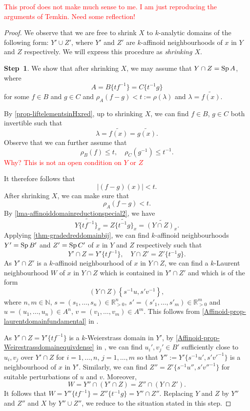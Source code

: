 \textcolor{red}{This proof does not make much sense to me. I am just reproducing the arguments of Temkin. Need some reflection!}


\begin{proof}
    We observe that we are free to shrink $X$ to $k$-analytic domains of the following form: $Y'\cup Z'$, where $Y'$ and $Z'$ are $k$-affinoid neighbourhoods of $x$ in $Y$ and $Z$ respectively. We will express this procedure as \emph{shrinking $X$}.

    \textbf{Step~1}. We show that after shrinking $X$, we may assume that $Y\cap Z=\operatorname{Sp} A$, where
    \[
        A=B\{tf^{-1}\}=C\{t^{-1}g\}  
    \]
    for some $f\in B$ and $g\in C$ and $\rho_A(f-g)<t:=\rho(\lambda)$ and $\lambda=\widetilde{f(x)}$.



    By \cref{prop-liftelementsinHxred}, up to shrinking $X$, we can find $f\in B$, $g\in C$ both invertible such that 
    \[
        \lambda=\widetilde{f(x)}=\widetilde{g(x)}.
    \]
    Observe that we can further assume that 
    \[
        \rho_B(f)\leq t,\quad \rho_C(g^{-1})\leq t^{-1}.
    \]
     \textcolor{red}{Why? This is not an open condition on $Y$ or $Z$}   

    It therefore follows that 
    \[
        |(f-g)(x)|<t.  
    \] 
    After shrinking $X$, we can make sure that 
    \[
        \rho_A(f-g)<t.
    \]
    By \cref{lma-affinoiddomainreductionspecial2}, we have
    \[
        \widetilde{Y\{tf^{-1}\}_x}= \widetilde{Z\{t^{-1}g\}_x}= \widetilde{(Y\cap Z)_x}.
    \]
    Applying \cref{thm-gradedreddomainbij}, we can find $k$-affinoid neighbourhoods $Y'=\operatorname{Sp} B'$ and $Z'=\operatorname{Sp} C'$ of $x$ in $Y$ and $Z$ respectively such that
    \[
        Y'\cap Z=Y'\{tf^{-1}\},\quad Y\cap Z'=Z'\{t^{-1}g\}. 
    \]
    As $Y'\cap Z'$ is a $k$-affinoid neighbourhood of $x$ in $Y\cap Z$, we can find a $k$-Laurent neighbourhood $W$ of $x$ in $Y\cap Z$ which is contained in $Y'\cap Z'$ and which is of the form
    \[
        (Y\cap Z)\left\{s^{-1}u,s'v^{-1}\right\},  
    \]
    where $n,m\in \mathbb{N}$, $s=(s_1,\ldots,s_n)\in \mathbb{R}_{>0}^n$, $s'=(s'_1,\ldots,s'_m)\in \mathbb{R}_{>0}^m$ and $u=(u_1,\ldots,u_n)\in A^n$, $v=(v_1,\ldots,v_m)\in A^m$. This follows from \cref{Affinoid-prop-laurentdomainfundamental} in .


    As $Y'\cap Z=Y'\{tf^{-1}\}$ is a $k$-Weierstrass domain in $Y'$, by \cref{Affinoid-prop-Weirestrassdomainequivdense} in ,
    we can find $u_i',v_j'\in B'$ sufficiently close to $u_i,v_j$ over $Y'\cap Z$ for $i=1,\dots,n$, $j=1,\ldots,m$ so that $Y'':=Y'\{s^{-1}u',s'v'^{-1}\}$ is a neighbourhood of $x$ in $Y'$. Similarly, we can find $Z''=Z'\{s^{-1}u'',s'v''^{-1}\}$ for suitable perturbations of $u$ and $v$. Moreover,
    \[
        W=Y''\cap (Y'\cap Z)=Z''\cap (Y\cap Z').  
    \]
    It follows that $W=Y''\{tf^{-1}\}=Z''\{t^{-1}g\}=Y''\cap Z''$. Replacing $Y$ and $Z$ by $Y''$ and $Z''$ and $X$ by $Y''\cup Z''$, we reduce to the situation stated in this step.



\end{proof}
